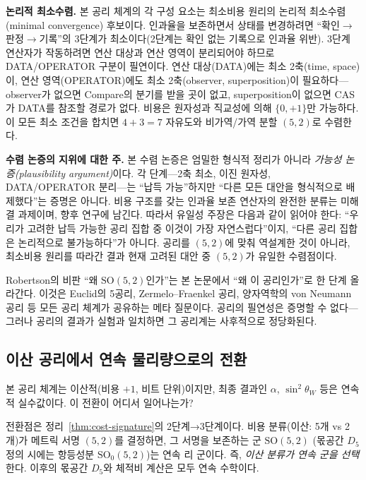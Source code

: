 \documentclass[entropy,article,submit,pdftex,oneauthor]{Definitions/mdpi}
\begin{document}
\textbf{논리적 최소수렴.} 본 공리 체계의 각 구성 요소는 최소비용 원리의 논리적 최소수렴(minimal convergence) 후보이다. 인과율을 보존하면서 상태를 변경하려면 ``확인$\to$판정$\to$기록''의 3단계가 최소이다(2단계는 확인 없는 기록으로 인과율 위반). 3단계 연산자가 작동하려면 연산 대상과 연산 영역이 분리되어야 하므로 DATA/OPERATOR 구분이 필연이다. 연산 대상(DATA)에는 최소 2축(time, space)이, 연산 영역(OPERATOR)에도 최소 2축(observer, superposition)이 필요하다---observer가 없으면 Compare의 분기를 받을 곳이 없고, superposition이 없으면 CAS가 DATA를 참조할 경로가 없다. 비용은 원자성과 직교성에 의해 $\{0, +1\}$만 가능하다. 이 모든 최소 조건을 합치면 $4 + 3 = 7$ 자유도와 비가역/가역 분할 $(5,2)$로 수렴한다.

\textbf{수렴 논증의 지위에 대한 주.} 본 수렴 논증은 엄밀한 형식적 정리가 아니라 \emph{가능성 논증(plausibility argument)}이다. 각 단계---2축 최소, 이진 원자성, DATA/OPERATOR 분리---는 ``납득 가능''하지만 ``다른 모든 대안을 형식적으로 배제했다''는 증명은 아니다. 비용 구조를 갖는 인과율 보존 연산자의 완전한 분류는 미해결 과제이며, 향후 연구에 남긴다. 따라서 유일성 주장은 다음과 같이 읽어야 한다: ``우리가 고려한 납득 가능한 공리 집합 중 이것이 가장 자연스럽다''이지, ``다른 공리 집합은 논리적으로 불가능하다''가 아니다. 공리를 $(5,2)$에 맞춰 역설계한 것이 아니라, 최소비용 원리를 따라간 결과 현재 고려된 대안 중 $(5,2)$가 유일한 수렴점이다.

Robertson의 비판 ``왜 $\mathrm{SO}(5,2)$인가''는 본 논문에서 ``왜 이 공리인가''로 한 단계 올라간다. 이것은 Euclid의 5공리, Zermelo--Fraenkel 공리, 양자역학의 von Neumann 공리 등 모든 공리 체계가 공유하는 메타 질문이다. 공리의 필연성은 증명할 수 없다---그러나 공리의 결과가 실험과 일치하면 그 공리계는 사후적으로 정당화된다.

\subsection{이산 공리에서 연속 물리량으로의 전환}

본 공리 체계는 이산적(비용 $+1$, 비트 단위)이지만, 최종 결과인 $\alpha$, $\sin^2\theta_W$ 등은 연속적 실수값이다. 이 전환이 어디서 일어나는가?

전환점은 정리~\ref{thm:cost-signature}의 2단계→3단계이다. 비용 분류(이산: 5개 vs 2개)가 메트릭 서명 $(5,2)$를 결정하면, 그 서명을 보존하는 군 $\mathrm{SO}(5,2)$ (몫공간 $D_5$ 정의 시에는 항등성분 $\mathrm{SO}_0(5,2)$)는 연속 리 군이다. 즉, \emph{이산 분류가 연속 군을 선택}한다. 이후의 몫공간 $D_5$와 체적비 계산은 모두 연속 수학이다.
\end{document}
